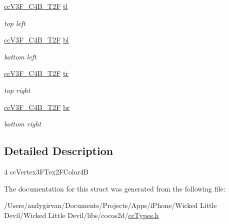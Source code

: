 \begin{DoxyCompactItemize}
\item 
\hypertarget{struct__cc_v3_f___c4_b___t2_f___quad_afa9dace8538060c750bb562b9427eef4}{\hyperlink{cc_types_8h_a674460527c4603d587ab6cef035ec755}{cc\-V3\-F\-\_\-\-C4\-B\-\_\-\-T2\-F} \hyperlink{struct__cc_v3_f___c4_b___t2_f___quad_afa9dace8538060c750bb562b9427eef4}{tl}}\label{struct__cc_v3_f___c4_b___t2_f___quad_afa9dace8538060c750bb562b9427eef4}

\begin{DoxyCompactList}\small\item\em top left \end{DoxyCompactList}\item 
\hypertarget{struct__cc_v3_f___c4_b___t2_f___quad_a39780de48d2b30f1a879d6e4811a674b}{\hyperlink{cc_types_8h_a674460527c4603d587ab6cef035ec755}{cc\-V3\-F\-\_\-\-C4\-B\-\_\-\-T2\-F} \hyperlink{struct__cc_v3_f___c4_b___t2_f___quad_a39780de48d2b30f1a879d6e4811a674b}{bl}}\label{struct__cc_v3_f___c4_b___t2_f___quad_a39780de48d2b30f1a879d6e4811a674b}

\begin{DoxyCompactList}\small\item\em bottom left \end{DoxyCompactList}\item 
\hypertarget{struct__cc_v3_f___c4_b___t2_f___quad_a3b6a9c87eddf12aef3fcdfc63d7ae204}{\hyperlink{cc_types_8h_a674460527c4603d587ab6cef035ec755}{cc\-V3\-F\-\_\-\-C4\-B\-\_\-\-T2\-F} \hyperlink{struct__cc_v3_f___c4_b___t2_f___quad_a3b6a9c87eddf12aef3fcdfc63d7ae204}{tr}}\label{struct__cc_v3_f___c4_b___t2_f___quad_a3b6a9c87eddf12aef3fcdfc63d7ae204}

\begin{DoxyCompactList}\small\item\em top right \end{DoxyCompactList}\item 
\hypertarget{struct__cc_v3_f___c4_b___t2_f___quad_abf01273031b16bf45be35dfb99b52224}{\hyperlink{cc_types_8h_a674460527c4603d587ab6cef035ec755}{cc\-V3\-F\-\_\-\-C4\-B\-\_\-\-T2\-F} \hyperlink{struct__cc_v3_f___c4_b___t2_f___quad_abf01273031b16bf45be35dfb99b52224}{br}}\label{struct__cc_v3_f___c4_b___t2_f___quad_abf01273031b16bf45be35dfb99b52224}

\begin{DoxyCompactList}\small\item\em bottom right \end{DoxyCompactList}\end{DoxyCompactItemize}


\subsection{Detailed Description}
4 cc\-Vertex3\-F\-Tex2\-F\-Color4\-B 

The documentation for this struct was generated from the following file\-:\begin{DoxyCompactItemize}
\item 
/\-Users/andygirvan/\-Documents/\-Projects/\-Apps/i\-Phone/\-Wicked Little Devil/\-Wicked Little Devil/libs/cocos2d/\hyperlink{cc_types_8h}{cc\-Types.\-h}\end{DoxyCompactItemize}

